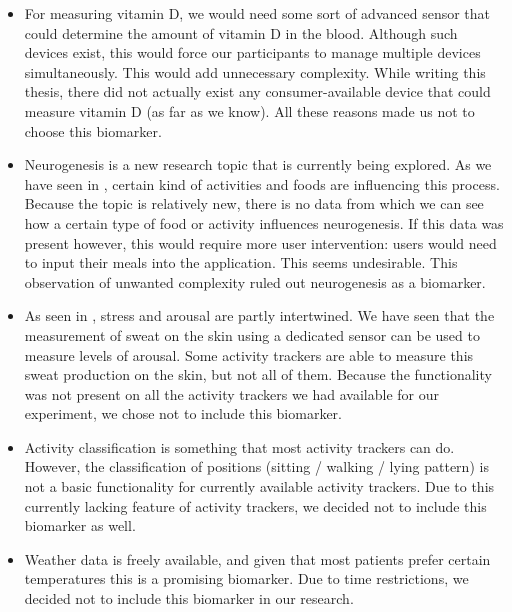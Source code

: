 \begin{itemize}
	\item For measuring vitamin D, we would need some sort of advanced sensor that could determine the amount of vitamin D in the blood. 
	Although such devices exist, this would force our participants to manage multiple devices simultaneously. 
	This would add unnecessary complexity.
	While writing this thesis, there did not actually exist any consumer-available device that could measure vitamin D (as far as we know).
	All these reasons made us not to choose this biomarker.
	
	\item Neurogenesis is a new research topic that is currently being explored.
	As we have seen in , certain kind of activities and foods are influencing this process.
	Because the topic is relatively new, there is no data from which we can see how a certain type of food or activity influences neurogenesis. 
	If this data was present however, this would require more user intervention: users would need to input their meals into the application.
	This seems undesirable.
	This observation of unwanted complexity ruled out neurogenesis as a biomarker.
	
	\item As seen in , stress and arousal are partly intertwined. 
	We have seen that the measurement of sweat on the skin using a dedicated sensor can be used to measure levels of arousal. 
	Some activity trackers are able to measure this sweat production on the skin, but not all of them. 
	Because the functionality was not present on all the activity trackers we had available for our experiment, we chose not to include this biomarker.
	
	\item Activity classification is something that most activity trackers can do.
	However, the classification of positions (sitting / walking / lying pattern) is not a basic functionality for currently available activity trackers.
	Due to this currently lacking feature of activity trackers, we decided not to include this biomarker as well.
	
	\item Weather data is freely available, and given that most patients prefer certain temperatures this is a promising biomarker. Due to time restrictions, we decided not to include this biomarker in our research.
	

\end{itemize}
